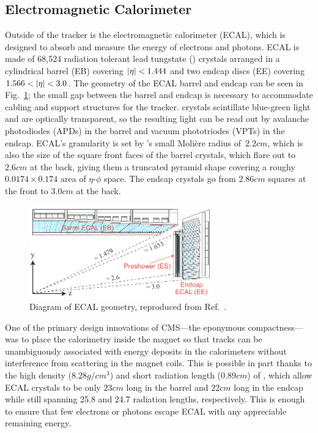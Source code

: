 \subsection{Electromagnetic Calorimeter}
Outside of the tracker is the electromagnetic calorimeter (ECAL), which is designed to absorb and measure the energy of electrons and photons.
ECAL is made of 68,524 radiation tolerant lead tungstate (\pbwo) crystals arranged in a cylindrical barrel (EB) covering $\lvert \eta \rvert < 1.444$ and two endcap discs (EE) covering $1.566 < \lvert \eta \rvert < 3.0$.
The geometry of the ECAL barrel and endcap can be seen in Fig.~\ref{fig:ecal}; the small gap between the barrel and endcap is necessary to accommodate cabling and support structures for the tracker.
\pbwo{} crystals scintillate blue-green light and are optically transparent, so the resulting light can be read out by avalanche photodiodes (APDs) in the barrel and vacuum phototriodes (VPTs) in the endcap.
ECAL's granularity is set by \pbwo's small {Moli\`ere} radius of~$2.2\unit{cm}$, which is also the size of the square front faces of the barrel crystals, which flare out to $2.6\unit{cm}$ at the back, giving them a truncated pyramid shape covering a roughy $0.0174 \times 0.174$ area of $\eta$-$\phi$ space.
The endcap crystals go from $2.86\unit{cm}$ squares at the front to $3.0\unit{cm}$ at the back.

\begin{figure}[htbp]
  \centering
  \includegraphics[width=0.7\textwidth]{experiment/ecal.png}
  \caption[ECAL geometry]{
    Diagram of ECAL geometry, reproduced from Ref.~\cite{Isildak:2013kfa}.
  }\label{fig:ecal}
\end{figure}

One of the primary design innovations of CMS---the eponymous compactness---was to place the calorimetry inside the magnet so that tracks can be unambiguously associated with energy deposits in the calorimeters without interference from scattering in the magnet coils.
This is possible in part thanks to the high density ($8.28\unit{g}/\unit{cm}^3$) and short radiation length ($0.89\unit{cm}$) of \pbwo, which allow ECAL crystals to be only $23\unit{cm}$ long in the barrel and $22\unit{cm}$ long in the endcap while still spanning 25.8 and 24.7 radiation lengths, respectively.
This is enough to ensure that few electrons or photons escape ECAL with any appreciable remaining energy.

